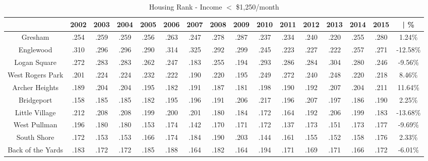 \documentclass{article}
\theoremstyle{definition}
\theoremstyle{remark}
\begin{document}
\begin{table}[h]\centering
\caption{Housing Rank -  Income $<$ \$1,250/month}\label{thelabel}
\begin{adjustbox}{center}
\begin{tabular}{||c | c c c c c c c c c c c c c c | c ||} 
 \hline
 & 2002 & 2003 & 2004 & 2005 & 2006 & 2007 & 2008 & 2009 & 2010 & 2011 & 2012 & 2013 & 2014 & 2015 & | \%\\[0.5ex] 
 \hline\hline
Gresham & .254 & .259 & .259 & .256 & .263 & .247 & .278 & .287 & .237 & .234 & .240 & .220 & .255 & .280 & 1.24\% \\
Englewood & .310 & .296 & .296 & .290 & .314 & .325 & .292 & .299 & .245 & .223 & .227 & .222 & .257 & .271 & -12.58\% \\
Logan Square & .272 & .283 & .283 & .262 & .247 & .183 & .255 & .194 & .293 & .286 & .284 & .304 & .280 & .246 & -9.56\% \\
West Rogers Park & .201 & .224 & .224 & .232 & .222 & .190 & .220 & .195 & .249 & .272 & .240 & .248 & .220 & .218 & 8.46\% \\
Archer Heights & .189 & .204 & .204 & .195 & .182 & .191 & .187 & .181 & .198 & .190 & .192 & .207 & .204 & .211 & 11.64\% \\
Bridgeport & .158 & .185 & .185 & .182 & .195 & .196 & .191 & .206 & .217 & .196 & .207 & .197 & .186 & .190 & 2.25\% \\
Little Village & .212 & .208 & .208 & .199 & .200 & .201 & .180 & .184 & .172 & .164 & .192 & .206 & .199 & .183 & -13.68\% \\
West Pullman & .196 & .180 & .180 & .153 & .174 & .142 & .170 & .171 & .172 & .137 & .173 & .151 & .173 & .177 & -9.69\% \\
South Shore & .172 & .153 & .153 & .166 & .174 & .184 & .190 & .203 & .144 & .161 & .155 & .152 & .158 & .176 & 2.33\% \\
Back of the Yards & .183 & .172 & .172 & .185 & .188 & .164 & .182 & .164 & .194 & .171 & .169 & .171 & .166 & .172 & -6.01\% \\
\hline
 \end{tabular}
\end{adjustbox}
\end{table}
\end{document}
